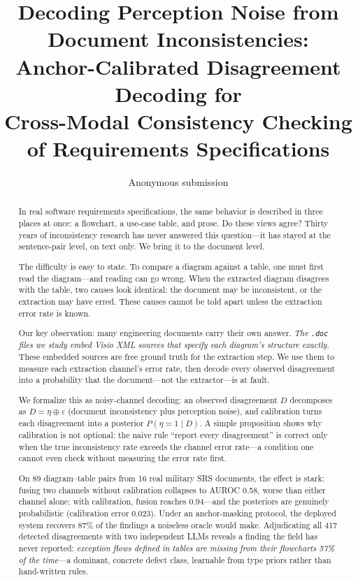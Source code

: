 \documentclass[10pt,twocolumn]{article}
\title{\textbf{Decoding Perception Noise from Document Inconsistencies:\\
Anchor-Calibrated Disagreement Decoding for\\
Cross-Modal Consistency Checking of Requirements Specifications}}
\author{Anonymous submission}
\date{}
\begin{document}
\maketitle

\begin{abstract}
In real software requirements specifications, the same behavior is
described in three places at once: a flowchart, a use-case table, and
prose.  Do these views agree?  Thirty years of inconsistency research
has never answered this question---it has stayed at the sentence-pair
level, on text only.  We bring it to the document level.

The difficulty is easy to state.  To compare a diagram against a
table, one must first read the diagram---and reading can go wrong.
When the extracted diagram disagrees with the table, two causes look
identical: the document may be inconsistent, or the extraction may
have erred.  These causes cannot be told apart unless the extraction
error rate is known.

Our key observation: many engineering documents carry their own
answer.  \emph{The \texttt{.doc} files we study embed Visio XML
sources that specify each diagram's structure exactly.}  These
embedded sources are free ground truth for the extraction step.  We
use them to measure each extraction channel's error rate, then
decode every observed disagreement into a probability that the
document---not the extractor---is at fault.

We formalize this as noisy-channel decoding: an observed disagreement
$D$ decomposes as $D = \eta \oplus \varepsilon$ (document
inconsistency plus perception noise), and calibration turns each
disagreement into a posterior $P(\eta{=}1 \mid D)$.  A simple
proposition shows why calibration is not optional: the naive rule
``report every disagreement'' is correct only when the true
inconsistency rate exceeds the channel error rate---a condition
one cannot even check without measuring the error rate first.

On 89 diagram--table pairs from 16 real military SRS documents, the
effect is stark: fusing two channels without calibration collapses to
AUROC 0.58, worse than either channel alone; with calibration, fusion
reaches 0.94---and the posteriors are genuinely probabilistic
(calibration error 0.023).  Under an anchor-masking protocol, the
deployed system recovers 87\% of the findings a noiseless oracle
would make.  Adjudicating all 417 detected disagreements with two
independent LLMs reveals a finding the field has never reported:
\emph{exception flows defined in tables are missing from their
flowcharts 57\% of the time}---a dominant, concrete defect class,
learnable from type priors rather than hand-written rules.
\end{abstract}
\end{document}
